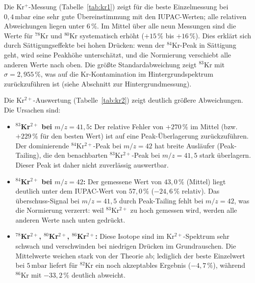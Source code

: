 \documentclass{article}
\begin{document}
Die Kr$^+$-Messung (Tabelle~\ref{tab:kr1}) zeigt f\"ur die beste
Einzelmessung bei $0{,}4\,\mathrm{mbar}$ eine sehr gute \"Ubereinstimmung
mit den IUPAC-Werten; alle relativen Abweichungen liegen unter $6\,\%$.
Im Mittel \"uber alle neun Messungen sind die Werte f\"ur $^{78}$Kr und
$^{80}$Kr systematisch erh\"oht ($+15\,\%$ bis $+16\,\%$).
Dies erkl\"art sich durch S\"attigungseffekte bei hohen Dr\"ucken: wenn
der $^{84}$Kr-Peak in S\"attigung geht, wird seine Peakh\"ohe
unterschätzt, und die Normierung verschiebt alle anderen Werte nach oben.
Die gr\"o\ss{}te Standardabweichung zeigt $^{83}$Kr mit $\sigma = 2{,}955\,\%$,
was auf die Kr-Kontamination im Hintergrundspektrum zur\"uckzuf\"uhren
ist (siehe Abschnitt zur Hintergrundmessung).

Die Kr$^{2+}$-Auswertung (Tabelle~\ref{tab:kr2}) zeigt deutlich gr\"o\ss{}ere
Abweichungen. Die Ursachen sind:

\begin{itemize}
    \item \textbf{$^{83}$Kr$^{2+}$ bei $m/z = 41{,}5$:}
        Der relative Fehler von $+270\,\%$ im Mittel (bzw.\ $+229\,\%$
        f\"ur den besten Wert) ist auf eine Peak-\"Uberlagerung
        zur\"uckzuf\"uhren.
        Der dominierende $^{84}$Kr$^{2+}$-Peak bei $m/z = 42$ hat breite
        Ausl\"aufer (Peak-Tailing), die den benachbarten
        $^{83}$Kr$^{2+}$-Peak bei $m/z = 41{,}5$ stark \"uberlagern.
        Dieser Peak ist daher nicht zuverl\"assig auswertbar.

    \item \textbf{$^{84}$Kr$^{2+}$ bei $m/z = 42$:}
        Der gemessene Wert von $43{,}0\,\%$ (Mittel) liegt deutlich unter
        dem IUPAC-Wert von $57{,}0\,\%$ ($-24{,}6\,\%$ relativ).
        Das \"uberschuss-Signal bei $m/z = 41{,}5$ durch Peak-Tailing
        fehlt bei $m/z = 42$, was die Normierung verzerrt: weil
        $^{83}$Kr$^{2+}$ zu hoch gemessen wird, werden alle anderen
        Werte nach unten gedr\"uckt.

    \item \textbf{$^{78}$Kr$^{2+}$, $^{80}$Kr$^{2+}$, $^{86}$Kr$^{2+}$:}
        Diese Isotope sind im Kr$^{2+}$-Spektrum sehr schwach und
        verschwinden bei niedrigen Dr\"ucken im Grundrauschen.
        Die Mittelwerte weichen stark von der Theorie ab; lediglich
        der beste Einzelwert bei $5\,\mathrm{mbar}$ liefert f\"ur
        $^{82}$Kr ein noch akzeptables Ergebnis ($-4{,}7\,\%$),
        w\"ahrend $^{86}$Kr mit $-33{,}2\,\%$ deutlich abweicht.
\end{itemize}
\end{document}

